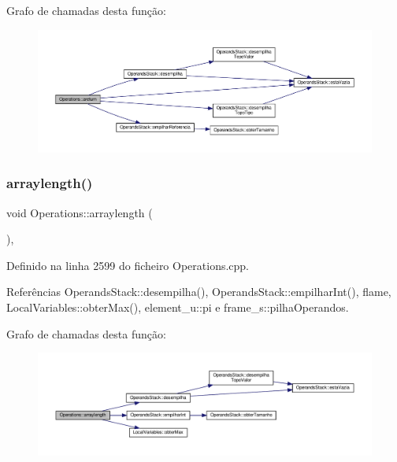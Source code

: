 Grafo de chamadas desta função\+:
\nopagebreak
\begin{figure}[H]
\begin{center}
\leavevmode
\includegraphics[width=350pt]{classOperations_a5829421b72f92d50dea0461953b26c5b_cgraph}
\end{center}
\end{figure}
\mbox{\label{classOperations_ae01c8bce2d6a583151dc0e46d1b8d52f}} 
\subsubsection{\texorpdfstring{arraylength()}{arraylength()}}
{\footnotesize\ttfamily void Operations\+::arraylength (\begin{DoxyParamCaption}{ }\end{DoxyParamCaption})\hspace{0.3cm}{\ttfamily [static]}, {\ttfamily [private]}}



Definido na linha 2599 do ficheiro Operations.\+cpp.



Referências Operands\+Stack\+::desempilha(), Operands\+Stack\+::empilhar\+Int(), flame, Local\+Variables\+::obter\+Max(), element\+\_\+u\+::pi e frame\+\_\+s\+::pilha\+Operandos.

Grafo de chamadas desta função\+:
\nopagebreak
\begin{figure}[H]
\begin{center}
\leavevmode
\includegraphics[width=350pt]{classOperations_ae01c8bce2d6a583151dc0e46d1b8d52f_cgraph}
\end{center}
\end{figure}
\mbox{\label{classOperations_aa414424bd203fb9788712fd2e74c3a32}} 
